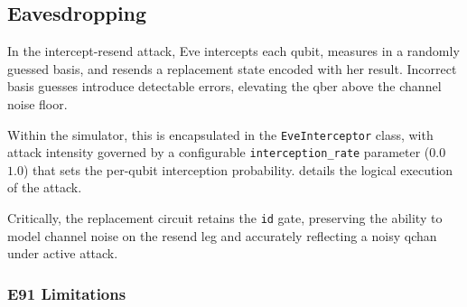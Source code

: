 \documentclass[11pt, a4paper]{report}
\begin{document}
\newpage
\subsection{Eavesdropping}
\label{subsec:eavesdropping}

In the intercept-resend attack, Eve intercepts each \gls{qubit}, measures in a randomly guessed basis, and resends a replacement state encoded with her result. Incorrect basis guesses introduce detectable errors, elevating the \gls{qber} above the channel noise floor.

Within the simulator, this is encapsulated in the \texttt{EveInterceptor} class, with attack intensity governed by a configurable \texttt{interception\_rate} parameter ($0.0$  $1.0$) that sets the per-\gls{qubit} interception probability.  details the logical execution of the attack.

\begin{algorithm}[htbp]
    \caption{Intercept-Resend Eavesdropper Logic.}\label{alg:eve_intercept}
\end{algorithm}

Critically, the replacement circuit retains the \texttt{id} gate, preserving the ability to model channel noise on the resend leg and accurately reflecting a noisy \gls{qchan} under active attack.

\subsubsection{E91 Limitations}
\end{document}
